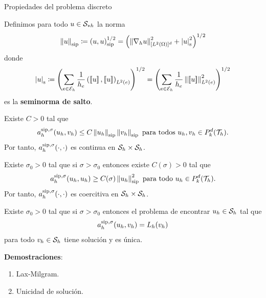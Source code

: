 \begin{frame}[allowframebreaks]{Propiedades del problema discreto}

\begin{definicion}
	Definimos para todo $u\in\S_{*h}$ la norma
	\begin{equation*}
	\norma{u}_{\text{sip}}\coloneqq\escalarsip{u}{u}^{1/2}=\left(\norma{\nabla_h u}^2_{[L^2(\Omega)]^d}+\left|u\right|^2_{\text{s}}\right)^{1/2}
	\end{equation*}
	donde
	\begin{equation*}
	\left|u\right|_{\text{s}}\coloneqq \left(\sum_{e\in\E_h}\frac{1}{h_e}\escalar{\salto{u}}{\salto{u}}_{L^2(e)}\right)^{1/2}=\left(\sum_{e\in\E_h}\frac{1}{h_e}\norma{\salto{u}}^2_{L^2(e)}\right)^{1/2}
	\end{equation*}
	es la \textbf{seminorma de salto}.
\end{definicion}
\framebreak
\begin{lemma}
	Existe $C>0$ tal que $$\asip{u_h}{v_h}\leq C\norma{u_h}_{\text{sip}}\normasip{v_h}\text{ para todos }u_h,v_h\in\mathbb{P}_k^d(\T_h).$$ Por tanto, $\asip{\cdot}{\cdot}$ es continua en $\S_h\times\S_h$.
\end{lemma}

\begin{lemma}
	\label{lemma:eliptico_coercitividad}
	Existe $\sigma_0>0$ tal que si $\sigma>\sigma_0$ entonces existe $C(\sigma)>0$ tal que $$\asip{u_h}{u_h}\geq C(\sigma)\norma{u_h}_{\text{sip}}^2\text{ para todo }u_h\in\mathbb{P}_k^d(\T_h).$$ Por tanto, $\asip{\cdot}{\cdot}$ es coercitiva en $\S_h\times\S_h$.
\end{lemma}
\framebreak
\begin{lemma}
	\label{lemma:buen_planteamiento_form_var_DG_elpitica}
	Existe $\sigma_0>0$ tal que si $\sigma>\sigma_0$ entonces el problema de encontrar $u_h\in\S_h$ tal que $$\asip{u_h}{v_h}=L_h(v_h)$$ para todo $v_h\in\S_h$ tiene solución y es única.
\end{lemma}
\textbf{Demostraciones}:
\begin{enumerate}
	\item Lax-Milgram.
	\item Unicidad de solución.
\end{enumerate}

\end{frame}

